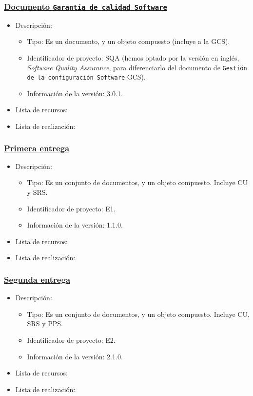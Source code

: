\documentclass[spanish,a4paper,11pt, twoside]{report}	%
\begin{document}
			\subsubsection{\underline{Documento \texttt{Garantía de calidad Software}}}
			\begin{itemize}	
				\item{Descripción:}
					\begin{itemize}	
						\item{Tipo:} Es un documento, y un objeto compuesto (incluye a la GCS). 
						\item{Identificador de proyecto:} SQA (hemos optado por la versión en inglés, \textit{Software Quality Assurance}, para diferenciarlo del documento de \texttt{Gestión de la configuración Software} GCS).
						\item{Información de la versión:} 3.0.1.
					\end{itemize}	
				\item{Lista de recursos:}
				\item{Lista de realización:}
			\end{itemize}	

			\subsubsection{\underline{Primera entrega}}
			\begin{itemize}	
				\item{Descripción:}
					\begin{itemize}	
						\item{Tipo:} Es un conjunto de documentos, y un objeto compuesto. Incluye CU y SRS. 
						\item{Identificador de proyecto:} E1.
						\item{Información de la versión:} 1.1.0.
					\end{itemize}	
				\item{Lista de recursos:}
				\item{Lista de realización:}
			\end{itemize}	

			\subsubsection{\underline{Segunda entrega}}
			\begin{itemize}	
				\item{Descripción:} 
					\begin{itemize}	
						\item{Tipo:} Es un conjunto de documentos, y un objeto compuesto. Incluye CU, SRS y PPS. 
						\item{Identificador de proyecto:} E2.
						\item{Información de la versión:} 2.1.0.
					\end{itemize}	
				\item{Lista de recursos:}
				\item{Lista de realización:}
			\end{itemize}	
\end{document}
